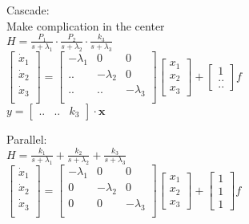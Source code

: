 \documentclass[4pt]{article}
\theoremstyle{definition}
\theoremstyle{definition}
\begin{document}
\begin{multicols}{3}
    Cascade:\\
    Make complication in the center\\
    \(H = \frac {P_1}{s+\lambda_1} \cdot \frac{P_2}{s+\lambda_2} \cdot \frac{k_3}{s+\lambda_3}\)\\
    \(
    \begin{bmatrix}
        \dot{x}_1\\
        \dot{x}_2\\
        \dot{x}_3\\
    \end{bmatrix}
    =
    \begin{bmatrix}
        -\lambda_1 & 0 & 0\\
        .. & -\lambda_2 & 0\\
        .. & .. & -\lambda_3\\     %
    \end{bmatrix}
    \begin{bmatrix}
        x_1\\
        x_2\\
        x_3
    \end{bmatrix}
    +
    \begin{bmatrix}
        1\\..\\..         %
    \end{bmatrix}
    f
    \)\\

    \(y =
    \begin{bmatrix}
        .. & .. & k_3       %
    \end{bmatrix}
    \cdot \mathbf x
    \)

    Parallel:\\
    \(H = \frac{k_1}{s+\lambda_1} + \frac{k_2}{s+\lambda_2} + \frac{k_3}{s+\lambda_3}\)\\
    \(
    \begin{bmatrix}
        \dot{x}_1\\
        \dot{x}_2\\
        \dot{x}_3\\
    \end{bmatrix}
    =
    \begin{bmatrix}
        -\lambda_1 & 0 & 0\\
        0 & -\lambda_2 & 0\\
        0 & 0 & -\lambda_3\\    %
    \end{bmatrix}
    \begin{bmatrix}
        x_1\\
        x_2\\
        x_3
    \end{bmatrix}
    +
    \begin{bmatrix}
        1\\1\\1         %
    \end{bmatrix}
    f
    \)\\


\end{multicols}
\end{document}
